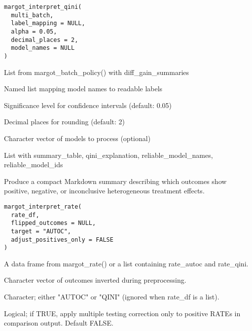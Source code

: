 \documentclass[a4paper]{book}
\begin{document}
%
\begin{Usage}
\begin{verbatim}
margot_interpret_qini(
  multi_batch,
  label_mapping = NULL,
  alpha = 0.05,
  decimal_places = 2,
  model_names = NULL
)
\end{verbatim}
\end{Usage}
%
\begin{Arguments}
\begin{ldescription}
\item[\code{multi\_batch}] List from margot\_batch\_policy() with diff\_gain\_summaries

\item[\code{label\_mapping}] Named list mapping model names to readable labels

\item[\code{alpha}] Significance level for confidence intervals (default: 0.05)

\item[\code{decimal\_places}] Decimal places for rounding (default: 2)

\item[\code{model\_names}] Character vector of models to process (optional)
\end{ldescription}
\end{Arguments}
%
\begin{Value}
List with summary\_table, qini\_explanation, reliable\_model\_names, reliable\_model\_ids
\end{Value}
%
\begin{Description}
Produce a compact Markdown summary describing which outcomes show positive,
negative, or inconclusive heterogeneous treatment effects.
\end{Description}
%
\begin{Usage}
\begin{verbatim}
margot_interpret_rate(
  rate_df,
  flipped_outcomes = NULL,
  target = "AUTOC",
  adjust_positives_only = FALSE
)
\end{verbatim}
\end{Usage}
%
\begin{Arguments}
\begin{ldescription}
\item[\code{rate\_df}] A data frame from margot\_rate() or a list containing
rate\_autoc and rate\_qini.

\item[\code{flipped\_outcomes}] Character vector of outcomes inverted during
preprocessing.

\item[\code{target}] Character; either "AUTOC" or "QINI" (ignored when rate\_df
is a list).

\item[\code{adjust\_positives\_only}] Logical; if TRUE, apply multiple testing correction
only to positive RATEs in comparison output. Default FALSE.
\end{ldescription}
\end{Arguments}
\end{document}
